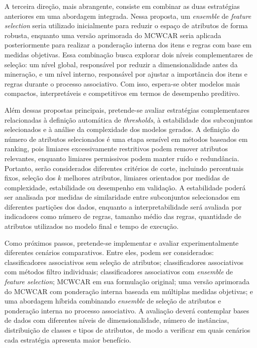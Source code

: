 A terceira direção, mais abrangente, consiste em combinar as duas estratégias anteriores em uma abordagem integrada. Nessa proposta, um \textit{ensemble} de \textit{feature selection} seria utilizado inicialmente para reduzir o espaço de atributos de forma robusta, enquanto uma versão aprimorada do MCWCAR seria aplicada posteriormente para realizar a ponderação interna dos itens e regras com base em medidas objetivas. Essa combinação busca explorar dois níveis complementares de seleção: um nível global, responsável por reduzir a dimensionalidade antes da mineração, e um nível interno, responsável por ajustar a importância dos itens e regras durante o processo associativo. Com isso, espera-se obter modelos mais compactos, interpretáveis e competitivos em termos de desempenho preditivo.

Além dessas propostas principais, pretende-se avaliar estratégias complementares relacionadas à definição automática de \textit{thresholds}, à estabilidade dos subconjuntos selecionados e à análise da complexidade dos modelos gerados. A definição do número de atributos selecionados é uma etapa sensível em métodos baseados em ranking, pois limiares excessivamente restritivos podem remover atributos relevantes, enquanto limiares permissivos podem manter ruído e redundância. Portanto, serão considerados diferentes critérios de corte, incluindo percentuais fixos, seleção dos $k$ melhores atributos, limiares orientados por medidas de complexidade, estabilidade ou desempenho em validação. A estabilidade poderá ser analisada por medidas de similaridade entre subconjuntos selecionados em diferentes partições dos dados, enquanto a interpretabilidade será avaliada por indicadores como número de regras, tamanho médio das regras, quantidade de atributos utilizados no modelo final e tempo de execução.

Como próximos passos, pretende-se implementar e avaliar experimentalmente diferentes cenários comparativos. Entre eles, podem ser considerados: classificadores associativos sem seleção de atributos; classificadores associativos com métodos filtro individuais; classificadores associativos com \textit{ensemble} de \textit{feature selection}; MCWCAR em sua formulação original; uma versão aprimorada do MCWCAR com ponderação interna baseada em múltiplas medidas objetivas; e uma abordagem híbrida combinando \textit{ensemble} de seleção de atributos e ponderação interna no processo associativo. A avaliação deverá contemplar bases de dados com diferentes níveis de dimensionalidade, número de instâncias, distribuição de classes e tipos de atributos, de modo a verificar em quais cenários cada estratégia apresenta maior benefício.

